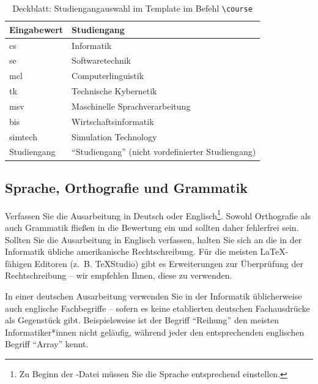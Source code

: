 \begin{table}
    \begin{tabular}{l|l}
        \textbf{Eingabewert} & \textbf{Studiengang}\\
        \hline
        cs & Informatik\\
        se & Softwaretechnik\\
        mcl & Computerlinguistik\\ 
        tk & Technische Kybernetik\\
        msv & Maschinelle Sprachverarbeitung\\
        bis & Wirtschaftsinformatik\\
        simtech & Simulation Technology\\
        Studiengang & ``Studiengang'' (nicht vordefinierter Studiengang)\\ 
    \end{tabular}
    \caption{Deckblatt: Studiengangauswahl im Template im Befehl \texttt{\textbackslash course}}
    \label{tab:studiengangauswahl}
\end{table}


\subsection{Sprache, Orthografie und Grammatik}
Verfassen Sie die Ausarbeitung in Deutsch oder Englisch\footnote{Zu Beginn der -Datei
  müssen Sie die Sprache entsprechend einstellen.}. Sowohl Orthografie als auch Grammatik fließen in
die Bewertung ein und sollten daher fehlerfrei sein.  Sollten Sie die Ausarbeitung in Englisch
verfassen, halten Sie sich an die in der Informatik übliche amerikanische Rechtschreibung.  Für die
meisten \LaTeX-fähigen Editoren (z.~B. TeXStudio) gibt es Erweiterungen zur Überprüfung der
Rechtschreibung -- wir empfehlen Ihnen, diese zu verwenden.

In einer deutschen Ausarbeitung verwenden Sie in der Informatik üblicherweise auch englische
Fachbegriffe -- sofern es keine etablierten deutschen Fachausdrücke als Gegenstück
gibt. Beispielsweise ist der Begriff ``Reihung'' den meisten Informatiker*innen nicht geläufig, während
jeder den entsprechenden englischen Begriff ``Array'' kennt.

